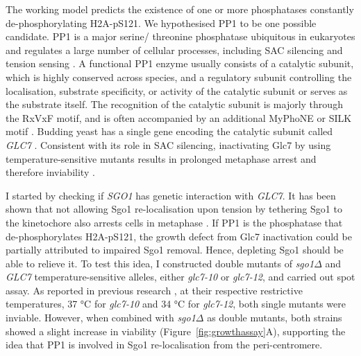 The working model predicts the existence of one or more phosphatases constantly de-phosphorylating H2A-pS121. We hypothesised PP1 to be one possible candidate. PP1 is a major serine/ threonine phosphatase ubiquitous in eukaryotes and regulates a large number of cellular processes, including SAC silencing and tension sensing \citep{Shi2009Serine/threonineStructure, Cannon2010FunctionCerevisiae, Pinsky2009ProteinYeast, Pinsky2006Glc7/proteinGlc7, London2012, Meadows2011SpindleMotors, Nijenhuis2014NegativeSignal, Rosenberg2011KNL1/Spc105Checkpoint, Liu2010RegulatedKinase, Posch2010Sds22Mitosis, Jin2013TheAttachment}. A functional PP1 enzyme usually consists of a catalytic subunit, which is highly conserved across species, and a regulatory subunit controlling the localisation, substrate specificity, or activity of the catalytic subunit or serves as the substrate itself. The recognition of the catalytic subunit is majorly through the RxVxF motif, and is often accompanied by an additional MyPhoNE or SILK motif \citep{Hendrickx2009DockingPhosphatase-1}. Budding yeast has a single gene encoding the catalytic subunit called \textit{GLC7} \citep{Cannon2010FunctionCerevisiae}. Consistent with its role in SAC silencing, inactivating Glc7 by using temperature-sensitive mutants results in prolonged metaphase arrest and therefore inviability \citep{Andrews2000TypeCerevisiae, MacKelvie1995ThePhosphatase}. 

I started by checking if \textit{SGO1} has genetic interaction with \textit{GLC7}. It has been shown that not allowing Sgo1 re-localisation upon tension by tethering Sgo1 to the kinetochore also arrests cells in metaphase \citep{Su2021SumoylationAnaphase}. If PP1 is the phosphatase that de-phosphorylates H2A-pS121, the growth defect from Glc7 inactivation could be partially attributed to impaired Sgo1 removal. Hence, depleting Sgo1 should be able to relieve it. To test this idea, I constructed double mutants of \textit{sgo1$\Delta$} and \textit{GLC7} temperature-sensitive alleles, either \textit{glc7-10} or \textit{glc7-12}, and carried out spot assay. As reported in previous research \citep{MacKelvie1995ThePhosphatase, Andrews2000TypeCerevisiae}, at their respective restrictive temperatures, 37 \si{\celsius} for \textit{glc7-10} and 34 \si{\celsius} for \textit{glc7-12}, both single mutants were inviable. However, when combined with \textit{sgo1$\Delta$} as double mutants, both strains showed a slight increase in viability (Figure~\ref{fig:growthassay}A), supporting the idea that PP1 is involved in Sgo1 re-localisation from the peri-centromere. 

